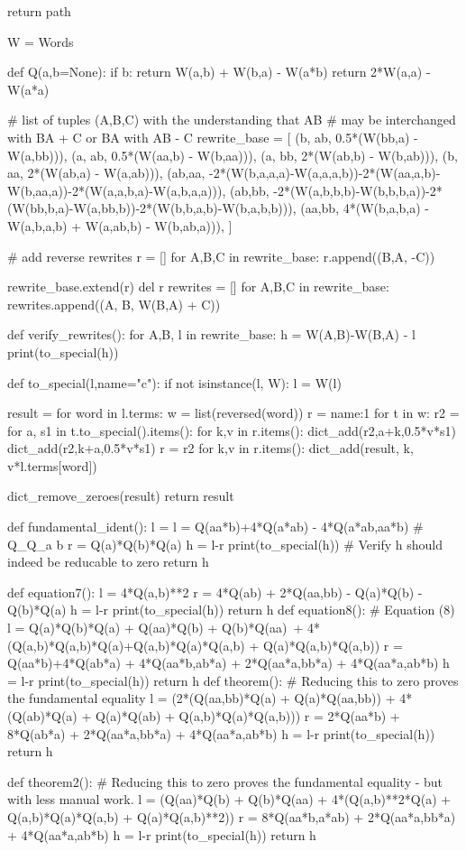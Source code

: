 \documentclass{article}
\begin{document}
\begin{python}
        return path

W = Words

def Q(a,b=None):
    if b: return W(a,b) + W(b,a) - W(a*b)
    return 2*W(a,a) - W(a*a)

# list of tuples (A,B,C) with the understanding that AB
# may be interchanged with BA + C or BA with AB - C
rewrite_base = [
    (b, ab, 0.5*(W(bb,a) - W(a,bb))),
    (a, ab, 0.5*(W(aa,b) - W(b,aa))),
    (a, bb, 2*(W(ab,b) - W(b,ab))),
    (b, aa, 2*(W(ab,a) - W(a,ab))),
    (ab,aa, -2*(W(b,a,a,a)-W(a,a,a,b))-2*(W(aa,a,b)-W(b,aa,a))-2*(W(a,a,b,a)-W(a,b,a,a))),
    (ab,bb, -2*(W(a,b,b,b)-W(b,b,b,a))-2*(W(bb,b,a)-W(a,bb,b))-2*(W(b,b,a,b)-W(b,a,b,b))),
    (aa,bb, 4*(W(b,a,b,a) - W(a,b,a,b) + W(a,ab,b) - W(b,ab,a))),
    ]

# add reverse rewrites
r = []
for A,B,C in rewrite_base:
    r.append((B,A, -C))

rewrite_base.extend(r)
del r
rewrites = []
for A,B,C in rewrite_base:
    rewrites.append((A, B, W(B,A) + C))

def verify_rewrites():
    for A,B, l in rewrite_base:
        h = W(A,B)-W(B,A) - l
        print(to_special(h))
    

def to_special(l,name="c"):
    if not isinstance(l, W):
        l = W(l)
        
    result = {}
    for word in l.terms:
        w = list(reversed(word))
        r = {name:1}
        for t in w:
            r2 = {}
            for a, s1 in t.to_special().items():
                for k,v in r.items():
                    dict_add(r2,a+k,0.5*v*s1)
                    dict_add(r2,k+a,0.5*v*s1)
            r = r2
        for k,v in r.items():
            dict_add(result, k, v*l.terms[word])
            
    dict_remove_zeroes(result)
    return result


def fundamental_ident():
    l = l = Q(aa*b)+4*Q(a*ab) - 4*Q(a*ab,aa*b) # Q_{Q_a b}
    r = Q(a)*Q(b)*Q(a)
    h = l-r
    print(to_special(h))  # Verify h should indeed be reducable to zero
    return h

def equation7():
    l = 4*Q(a,b)**2
    r = 4*Q(ab) + 2*Q(aa,bb) - Q(a)*Q(b) - Q(b)*Q(a)
    h = l-r
    print(to_special(h))
    return h
def equation8(): # Equation (8)
    l = Q(a)*Q(b)*Q(a) + Q(aa)*Q(b) + Q(b)*Q(aa)\
        + 4*(Q(a,b)*Q(a,b)*Q(a)+Q(a,b)*Q(a)*Q(a,b) + Q(a)*Q(a,b)*Q(a,b))
    r = Q(aa*b)+4*Q(ab*a) + 4*Q(aa*b,ab*a) + 2*Q(aa*a,bb*a) + 4*Q(aa*a,ab*b)
    h = l-r
    print(to_special(h))
    return h
def theorem(): # Reducing this to zero proves the fundamental equality
    l = (2*(Q(aa,bb)*Q(a) + Q(a)*Q(aa,bb)) 
         + 4*(Q(ab)*Q(a) + Q(a)*Q(ab) + Q(a,b)*Q(a)*Q(a,b)))
    r = 2*Q(aa*b) + 8*Q(ab*a) + 2*Q(aa*a,bb*a) + 4*Q(aa*a,ab*b)
    h = l-r
    print(to_special(h))
    return h

def theorem2(): # Reducing this to zero proves the fundamental equality - but with less manual work.
    l = (Q(aa)*Q(b) + Q(b)*Q(aa) + 4*(Q(a,b)**2*Q(a)
        + Q(a,b)*Q(a)*Q(a,b) + Q(a)*Q(a,b)**2))
    r = 8*Q(aa*b,a*ab) + 2*Q(aa*a,bb*a) + 4*Q(aa*a,ab*b)
    h = l-r
    print(to_special(h))
    return h

\end{python}
\end{document}
